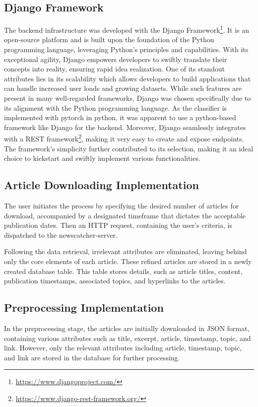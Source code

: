 \documentclass[a4paper,10pt]{report} %
\begin{document}
\subsection{Django Framework}
The backend infrastructure was developed with the Django Framework\footnote{\url{https://www.djangoproject.com/}}. It is an open-source platform and is built upon the foundation of the Python programming language, leveraging Python's principles and capabilities. With its exceptional agility, Django empowers developers to swiftly translate their concepts into reality, ensuring rapid idea realization. One of its standout attributes lies in its scalability which allows developers to build applications that can handle increased user loads and growing datasets. While such features are present in many well-regarded frameworks, Django was chosen specifically due to its alignment with the Python programming language. As the classifier is implemented with pytorch in python, it was apparent to use a python-based framework like Django for the backend. Moreover, Django seamlessly integrates with a REST framework\footnote{\url{https://www.django-rest-framework.org/}}, making it very easy to create and expose endpoints. The framework's simplicity further contributed to its selection, making it an ideal choice to kickstart and swiftly implement various functionalities.

\subsection{Article Downloading Implementation}
The user initiates the process by specifying the desired number of articles for download, accompanied by a designated timeframe that dictates the acceptable publication dates. Then an HTTP request, containing the user's criteria, is dispatched to the newscatcher-server.

Following the data retrieval, irrelevant attributes are eliminated, leaving behind only the core elements of each article. These refined articles are stored in a newly created database table. This table stores details, such as article titles, content, publication timestamps, associated topics, and hyperlinks to the articles.

\subsection{Preprocessing Implementation}
In the preprocessing stage, the articles are initially downloaded in JSON format, containing various attributes such as title, excerpt, article, timestamp, topic, and link. However, only the relevant attributes including article, timestamp, topic, and link are stored in the database for further processing.
\end{document}
